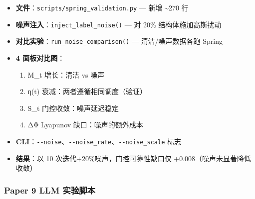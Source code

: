 \documentclass[
  12pt,
]{ctexart}
\providecommand{\tightlist}{%
  \setlength{\itemsep}{0pt}\setlength{\parskip}{0pt}}
\begin{document}
\begin{itemize}
\tightlist
\item
  \textbf{文件}：\texttt{scripts/spring\_validation.py} --- 新增
  \textasciitilde270 行
\item
  \textbf{噪声注入}：\texttt{inject\_label\_noise()} --- 对 20\%
  结构体施加高斯扰动
\item
  \textbf{对比实验}：\texttt{run\_noise\_comparison()} ---
  清洁/噪声数据各跑 Spring
\item
  \textbf{4 面板对比图}：

  \begin{enumerate}
  \def\labelenumi{\arabic{enumi}.}
  \tightlist
  \item
    \textbar M\_t\textbar{} 增长：清洁 vs 噪声
  \item
    η(t) 衰减：两者遵循相同调度（验证）
  \item
    S\_t 门控收敛：噪声延迟稳定
  \item
    ΔΦ Lyapunov 缺口：噪声的额外成本
  \end{enumerate}
\item
  \textbf{CLI}：\texttt{-\/-noise}、\texttt{-\/-noise\_rate}、\texttt{-\/-noise\_scale}
  标志
\item
  \textbf{结果}：以 10 次迭代+20\%噪声，门控可靠性缺口仅
  +0.008（噪声未显著降低收敛）
\end{itemize}

\subsubsection{Paper 9 LLM
实验脚本}\label{paper-9-llm-ux5b9eux9a8cux811aux672c}
\end{document}

